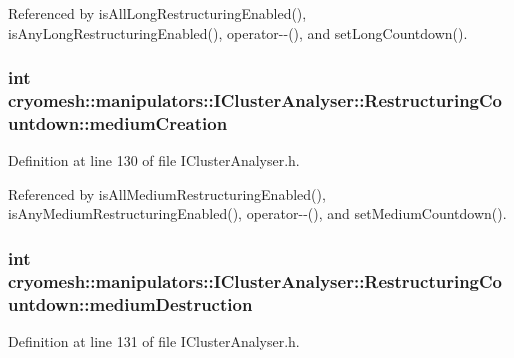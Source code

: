 \-Referenced by is\-All\-Long\-Restructuring\-Enabled(), is\-Any\-Long\-Restructuring\-Enabled(), operator-\/-\/(), and set\-Long\-Countdown().

\hypertarget{structcryomesh_1_1manipulators_1_1IClusterAnalyser_1_1RestructuringCountdown_ad67471fc6daa6384e77d4e6681decce5}{
\subsubsection[{medium\-Creation}]{\setlength{\rightskip}{0pt plus 5cm}int {\bf cryomesh\-::manipulators\-::\-I\-Cluster\-Analyser\-::\-Restructuring\-Countdown\-::medium\-Creation}}}\label{structcryomesh_1_1manipulators_1_1IClusterAnalyser_1_1RestructuringCountdown_ad67471fc6daa6384e77d4e6681decce5}


\-Definition at line 130 of file \-I\-Cluster\-Analyser.\-h.



\-Referenced by is\-All\-Medium\-Restructuring\-Enabled(), is\-Any\-Medium\-Restructuring\-Enabled(), operator-\/-\/(), and set\-Medium\-Countdown().

\hypertarget{structcryomesh_1_1manipulators_1_1IClusterAnalyser_1_1RestructuringCountdown_ae6adfde336b7d67ad433991af81652b4}{
\subsubsection[{medium\-Destruction}]{\setlength{\rightskip}{0pt plus 5cm}int {\bf cryomesh\-::manipulators\-::\-I\-Cluster\-Analyser\-::\-Restructuring\-Countdown\-::medium\-Destruction}}}\label{structcryomesh_1_1manipulators_1_1IClusterAnalyser_1_1RestructuringCountdown_ae6adfde336b7d67ad433991af81652b4}


\-Definition at line 131 of file \-I\-Cluster\-Analyser.\-h.



